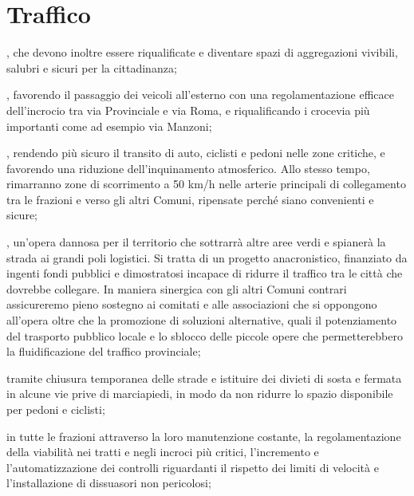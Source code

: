 \section{Traffico}
, che devono inoltre essere riqualificate e diventare spazi di aggregazioni vivibili, salubri e sicuri per la cittadinanza;

, favorendo il passaggio dei veicoli all'esterno con una regolamentazione efficace dell'incrocio tra via Provinciale e via Roma, e riqualificando i crocevia più importanti come ad esempio via Manzoni;

, rendendo più sicuro il transito di auto, ciclisti e pedoni nelle zone critiche, e favorendo una riduzione dell'inquinamento atmosferico. Allo stesso tempo, rimarranno zone di scorrimento a 50 km/h nelle arterie principali di collegamento tra le frazioni e verso gli altri Comuni, ripensate perché siano convenienti e sicure; 

\begin{bluebox}
, un'opera dannosa per il territorio che sottrarrà altre aree verdi e spianerà la strada ai grandi poli logistici. Si tratta di un progetto anacronistico, finanziato da ingenti fondi pubblici e dimostratosi incapace di ridurre il traffico tra le città che dovrebbe collegare. In maniera sinergica con gli altri Comuni contrari assicureremo pieno sostegno ai comitati e alle associazioni che si oppongono all'opera oltre che la promozione di soluzioni alternative, quali il potenziamento del trasporto pubblico locale e lo sblocco delle piccole opere che permetterebbero la fluidificazione del traffico provinciale;
\end{bluebox}

 tramite chiusura temporanea delle strade e istituire dei divieti di sosta e fermata in alcune vie prive di marciapiedi, in modo da non ridurre lo spazio disponibile per pedoni e ciclisti;

 in tutte le frazioni attraverso la loro manutenzione costante, la regolamentazione della viabilità nei tratti e negli incroci più critici, l'incremento e l'automatizzazione dei controlli riguardanti il rispetto dei limiti di velocità e l'installazione di dissuasori non pericolosi;


